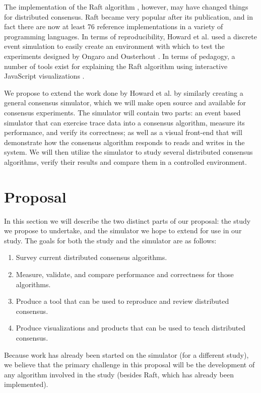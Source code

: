\documentclass[11pt,letterpaper]{article}
\begin{document}
The implementation of the Raft algorithm \cite{ongaro_search_2014}, however, may have changed things for distributed consensus. Raft became very popular after its publication, and in fact there are now at least 76 reference implementations in a variety of programming languages. In terms of reproducibility, Howard et al. used a discrete event simulation to easily create an environment with which to test the experiments designed by Ongaro and Ousterhout \cite{howard_raft_2015}. In terms of pedagogy, a number of tools exist for explaining the Raft algorithm using interactive JavaScript visualizations \cite{johnson_secret_2014,ongaro_raft_2015}.

We propose to extend the work done by Howard et al. by similarly creating a general consensus simulator, which we will make open source and available for consensus experiments. The simulator will contain two parts: an event based simulator that can exercise trace data into a consensus algorithm, measure its performance, and verify its correctness; as well as a visual front-end that will demonstrate how the consensus algorithm responds to reads and writes in the system. We will then utilize the simulator to study several distributed consensus algorithms, verify their results and compare them in a controlled environment.

\section*{Proposal}

In this section we will describe the two distinct parts of our proposal: the study we propose to undertake, and the simulator we hope to extend for use in our study. The goals for both the study and the simulator are as follows:

\begin{enumerate}
    \setlength\itemsep{-0.75em}
    \item Survey current distributed consensus algorithms.
    \item Measure, validate, and compare performance and correctness for those algorithms.
    \item Produce a tool that can be used to reproduce and review distributed consensus.
    \item Produce visualizations and products that can be used to teach distributed consensus.
\end{enumerate}

Because work has already been started on the simulator (for a different study), we believe that the primary challenge in this proposal will be the development of any algorithm involved in the study (besides Raft, which has already been implemented).
\end{document}
